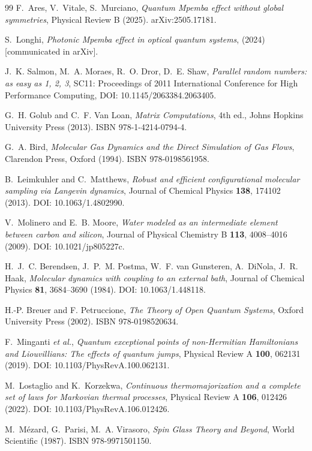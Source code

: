 \begin{thebibliography}{99}
F.~Ares, V.~Vitale, S.~Murciano,
\emph{Quantum Mpemba effect without global symmetries},
Physical Review B (2025).
arXiv:2505.17181.

S.~Longhi,
\emph{Photonic Mpemba effect in optical quantum systems},
(2024) [communicated in arXiv].

J.~K. Salmon, M.~A. Moraes, R.~O. Dror, D.~E. Shaw,
\emph{Parallel random numbers: as easy as 1, 2, 3},
SC11: Proceedings of 2011 International Conference for High Performance Computing,
DOI: 10.1145/2063384.2063405.

G.~H. Golub and C.~F. Van Loan,
\emph{Matrix Computations}, 4th ed.,
Johns Hopkins University Press (2013).
ISBN 978-1-4214-0794-4.

G.~A. Bird,
\emph{Molecular Gas Dynamics and the Direct Simulation of Gas Flows},
Clarendon Press, Oxford (1994).
ISBN 978-0198561958.

B.~Leimkuhler and C.~Matthews,
\emph{Robust and efficient configurational molecular sampling via Langevin dynamics},
Journal of Chemical Physics \textbf{138}, 174102 (2013).
DOI: 10.1063/1.4802990.

V.~Molinero and E.~B. Moore,
\emph{Water modeled as an intermediate element between carbon and silicon},
Journal of Physical Chemistry B \textbf{113}, 4008--4016 (2009).
DOI: 10.1021/jp805227c.

H.~J.~C. Berendsen, J.~P.~M. Postma, W.~F. van Gunsteren, A.~DiNola, J.~R. Haak,
\emph{Molecular dynamics with coupling to an external bath},
Journal of Chemical Physics \textbf{81}, 3684--3690 (1984).
DOI: 10.1063/1.448118.

H.-P. Breuer and F. Petruccione,
\emph{The Theory of Open Quantum Systems},
Oxford University Press (2002).
ISBN 978-0198520634.

F.~Minganti \emph{et al.},
\emph{Quantum exceptional points of non-Hermitian Hamiltonians and Liouvillians: The effects of quantum jumps},
Physical Review A \textbf{100}, 062131 (2019).
DOI: 10.1103/PhysRevA.100.062131.

M.~Lostaglio and K.~Korzekwa,
\emph{Continuous thermomajorization and a complete set of laws for Markovian thermal processes},
Physical Review A \textbf{106}, 012426 (2022).
DOI: 10.1103/PhysRevA.106.012426.

M.~Mézard, G.~Parisi, M.~A. Virasoro,
\emph{Spin Glass Theory and Beyond},
World Scientific (1987).
ISBN 978-9971501150.

\end{thebibliography}
